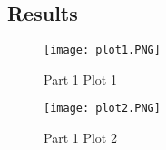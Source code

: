 \subsection{Results}

 \begin{figure}[H]
   \centering
   \texttt{[image: plot1.PNG]}
   \caption{Part 1 Plot 1}
 \end{figure}
 
  \begin{figure}[H]
    \centering
    \texttt{[image: plot2.PNG]}
    \caption{Part 1 Plot 2}
  \end{figure}



